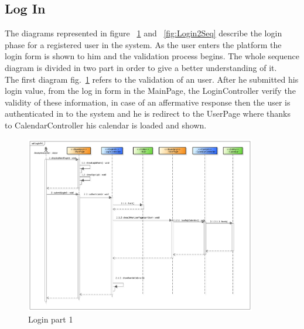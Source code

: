   \subsection{Log In}
  The diagrams represented in figure ~\ref{fig:Login1Seq}  and ~\ref{fig:Login2Seq} describe the login phase for a registered user in the system. As the user enters the platform the login form is shown to him and the validation process begins. The whole sequence diagram is divided in two part in order to  give a better understanding of it.\\
  The first diagram fig.~\ref{fig:Login1Seq} refers to the validation of an user. After he submitted his login value, from the log in form in the MainPage, the LoginController verify the validity of these information, in case of an affermative response then the user is authenticated in to the system and he is redirect to the UserPage where thanks to CalendarController his calendar is loaded and shown.
  \begin{center}
 \begin{figure}[H]
    \includegraphics[width=0.9\textwidth]{../BCEDiagram/BCE/EntityOverview/LoginPt1.png}
    \caption{Login part 1}
     \label{fig:Login1Seq}
     \end{figure}
   \end{center}  
